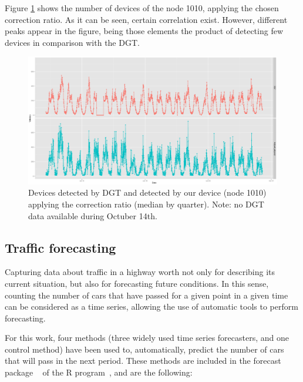 \documentclass[preprint]{elsarticle}
\begin{document}
Figure \ref{fig:dgtRatios} shows the number of devices of the node 1010, applying the chosen correction ratio. As it can be seen, certain correlation exist. However, different peaks appear in the figure, being those elements the product of detecting few devices in comparison with the DGT.



\begin{figure}[htb]
	\begin{center}
		\includegraphics[scale=0.4]{imgs/petra_graph_DGT-Mobywit-mended.eps}
		\caption{Devices detected by DGT and detected by our device (node 1010) applying the correction ratio (median by quarter). Note: no DGT data available during Octuber 14th.}
	\label{fig:dgtRatios}
	\end{center}
\end{figure}

\subsection{Traffic forecasting}
\label{sub:ts_forecasting}
Capturing data about traffic in a highway worth not only for describing its current situation, but also for forecasting future conditions. In this sense, counting the number of cars that have passed for a given point in a given time can be considered as a time series, allowing the use of automatic tools to perform forecasting.

For this work, four methods (three widely used time series forecasters, and one control method) have been used to, automatically, predict the number of cars that will pass in the next period. These methods are included in the forecast package ~\cite{Hyndman08automatictime} of the R program~\cite{R:Bloomfield:2014}, and are the following:
\end{document}
